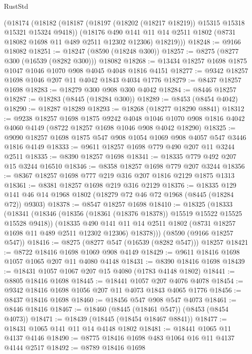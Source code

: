 \begin{lexlean}{RustStd}
\begin{coremodule}
    (@18174
      (@18182
        (@18187 (@18197 (@18202 (@18217 @18219)) @15315 @15318 @15321 @15324 @9418))
        (@18176
          @490
          @141
          @11
          @14
          @2511
          @1802
          (@8731 @18082 @1698 @11 @489 @2511 @12302 @12306)
          @18219)))
@18248 := @9166 @18082
@18251 := @18247 (@8590 (@18248 @300))
@18257 := @8275 (@8277 @300 (@16539 (@8282 @300))) @18082
@18268 := @13434 @18257 @1698 @1875 @1047 @1046 @1070 @908 @4045 @4048 @1816 @4151
@18277 := @9342 @18257 @1698 @1046 @207 @11 @4042 @1843 @4034 @1776
@18279 := @8437 @18257 @1698
@18283 := @18279 @300 @908 @300 @4042
@18284 := @8446 @18257
@18287 := @18283 (@8445 (@18284 @300))
@18289 := @8453 (@8454 @4042)
@18290 := @18287 @18289
@18293 := @18268 (@18277 @18290 @8841)
@18312 := @9238
    @18257
    @1698
    @1875
    @9242
    @4048
    @1046
    @1070
    @908
    @1816
    @4042
    @4060
    @4149
    (@8722 @18257 @1698 @1046 @908 @4042 @18290)
@18325 := @9090 @18257 @1698 @1875 @547 @908 @1054 @1069 @908 @4057 @547 @3446 @1816 @4149
@18333 := @9611 @18257 @1698 @779 @490 @207 @11 @3244 @2511
@18335 := @8390 @18257 @1698
@18341 := @18335 @779 @492 @207 @15 @3244 @16510
@18346 := @8358 @18257 @1698 @779 @207 @3244
@18356 := @8367 @18257 @1698 @777 @219 @316 @207 @1816 @2129 @1875 @1313
@18361 := @8381 @18257 @1698 @219 @316 @2129
@18376 := @18335 @129 @141 @46 @14 @1968 @1802 (@18279 @72 @46 @72 @1968 (@8445 (@18284 @72)) @9303)
@18378 := @8547 @18257 @1698
@18410 := @18325
    (@18333
      (@18341
        (@18346 (@18356 (@18361 (@18376 @18378)) @15519 @15522 @15525 @15528 @9418))
        (@18335
          @490
          @141
          @11
          @14
          @2511
          @1802
          (@8731 @18257 @1698 @11 @489 @2511 @12302 @12306)
          @18378)))
    (@8590 (@9166 @18257 @547))
@18416 := @8275 (@8277 @547 (@16539 (@8282 @547))) @18257
@18421 := @8722 @18416 @1698 @1069 @908 @4149
@18429 := @9611 @18416 @1698 @1057 @1065 @207 @11 @4080 @4148
@18431 := @8390 @18416 @1698
@18439 := @18431 @1057 @1067 @207 @15 @4080 (@1783 @4148 @1802)
@18441 := @8805 @18416 @1698
@18445 := @18441 @1057 @207 @4076 @4078
@18454 := @9342 @18416 @1698 @1056 @207 @11 @4073 @1843 @4065 @1776
@18456 := @8437 @18416 @1698
@18460 := @18456 @547 @908 @547 @4073
@18461 := @8446 @18416
@18467 := @18460 (@8445 (@18461 @547)) (@8453 (@8454 @4073))
@18471 := @18439 (@18445 (@18454 @18467 @8841))
@18477 := @18431 @1065 @141 @11 @14 @4148 @1802
@18481 := @18441 @1065 @11 @4137 @4146
@18490 := @8775 @18416 @1698 @483 @1064 @16 @11 @4137 @4144 @2517
@18492 := @8789 @18416 @1698

\end{coremodule}
\end{lexlean}
